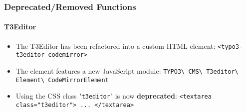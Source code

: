 %

\begin{frame}[fragile]
	\frametitle{Deprecated/Removed Functions}
	\framesubtitle{T3Editor}

	\begin{itemize}
		\item The T3Editor has been refactored into a custom HTML element:\newline
			\smaller\texttt{<typo3-t3editor-codemirror>}\normalsize

		\item The element features a new JavaScript module:\newline
			\small
				\texttt{TYPO3\textbackslash
					CMS\textbackslash
					T3editor\textbackslash
					Element\textbackslash
					CodeMirrorElement}
			\normalsize

		\item Using the CSS class "\texttt{t3editor}" is now \textbf{deprecated}:\newline
			\smaller\texttt{<textarea class="t3editor"> ... </textarea>}\normalsize

	\end{itemize}

\end{frame}

